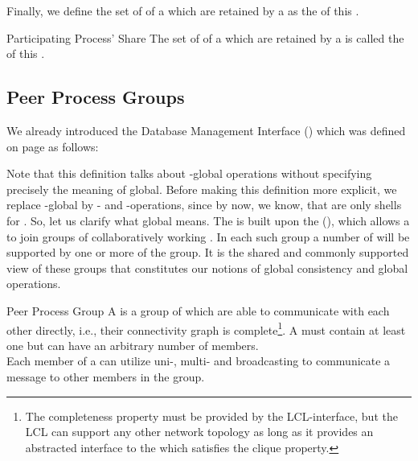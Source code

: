 \documentclass[a4paper, 12pt]{book}
\begin{document}
Finally, we define the set of  of a 
which are retained by a  as the  of
this . 
%
\begin{definition*}{Participating Process' Share}
  The set of  of a  which are retained by a
   is called the  of this
  . 
\end{definition*}


\subsection{Peer Process Groups}

We already introduced the Database Management Interface (\DBMI) which was
defined on page \pageref{def:database-management-interface} as follows:
\begin{quote}
  \DBMIquote
\end{quote}
%
Note that this definition talks about -global operations
without specifying precisely the meaning of global. Before making this
definition more explicit, we replace -global by
- and -operations, since by now, we know,
that  are only shells for . 
%
So, let us clarify what global means. The \SYNEIGHT is
built upon the  (), which
allows a  to join groups of collaboratively
working . In each such group a number of 
will be supported by one or more  of the group. It is
the shared and commonly supported view of these groups that
constitutes our notions of global consistency and global operations.
%
\begin{definition*}{Peer Process Group}
  A  is a group of 
  which are able to communicate with each other directly, i.e., their
  connectivity graph is complete\footnote{The completeness property must
  be provided by the LCL-interface, but the LCL can support any other
  network topology as long as it provides an abstracted interface
  to the \SYNEIGHT which satisfies the clique property.}. A
   must contain at least one  but
  can have an arbitrary number of members.\\ 
  Each member of a  can utilize uni-, multi-
  and broadcasting to communicate a message to other members in the
  group.
\end{definition*}
\end{document}
